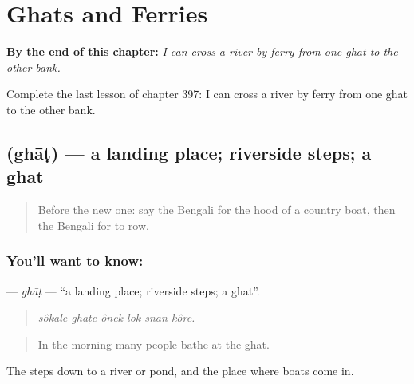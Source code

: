 
\chapter{Ghats and Ferries}
\label{ch:bn-ghats-and-ferries}

\begin{chapteropening}
\textbf{By the end of this chapter:} \emph{I can cross a river by ferry from one ghat to the other bank.}

Complete the last lesson of chapter 397: I can cross a river by ferry from one ghat to the other bank.
\end{chapteropening}

\section[\texorpdfstring{\bn{ঘাট} (ghāṭ)}{ঘাট (ghāṭ)}]{ (ghāṭ) — a landing place; riverside steps; a ghat}

\label{lesson:BN-C397-ghat}



\begin{quote}
Before the new one: say the Bengali for the hood of a country boat, then the Bengali for to row.
\end{quote}

\subsection*{You'll want to know: }
\textbf{} — \emph{ghāṭ} — \textquotedblleft{}a landing place; riverside steps; a ghat\textquotedblright{}.

\begin{quote}
     
\end{quote}

\begin{quote}
\emph{sôkāle ghāṭe ônek lok snān kôre.}
\end{quote}

\begin{quote}
In the morning many people bathe at the ghat.
\end{quote}

The steps down to a river or pond, and the place where boats come in.

